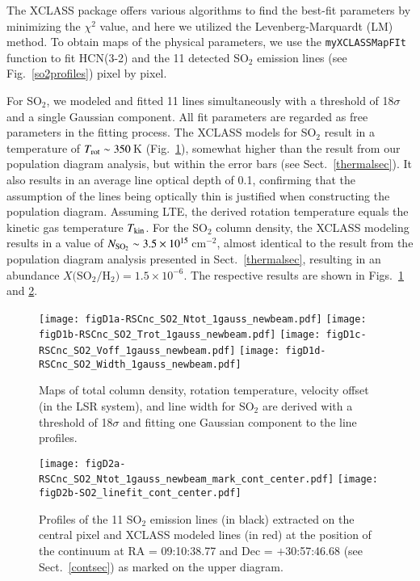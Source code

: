 \documentclass{aa}
\begin{document}
\begin{appendix}
The XCLASS package offers various algorithms to find the best-fit
parameters by minimizing the $\chi^2$ value, and here we utilized the
Levenberg-Marquardt (LM) method. To obtain maps of the physical
parameters, we use the \texttt{myXCLASSMapFIt} function to fit
HCN(3-2) and the 11 detected SO$_2$ emission lines (see
Fig.~\ref{so2profiles}) pixel by pixel.

For SO$_2$, we modeled and fitted 11 lines simultaneously with a
threshold of 18$\sigma$ and a single Gaussian component. All fit
parameters are regarded as free parameters in the fitting process.
The XCLASS models for SO$_2$ result in a temperature of $T_{\rm rot}
\sim350$\,K (Fig.~\ref{fig:so2_xclass}), somewhat higher than the
result from our population diagram analysis, but within the error bars
(see Sect.~\ref{thermalsec}).  It also results in an average line
optical depth of 0.1, confirming that the assumption of the lines
being optically thin is justified when constructing the population
diagram.  Assuming LTE, the derived rotation temperature equals the
kinetic gas temperature $T_{\rm kin}$. For the SO$_2$ column density,
the XCLASS modeling results in a value of $N_{\rm SO_2}
\sim3.5\times10^{15}$\,cm$^{-2}$, almost identical to  the result from
the population diagram analysis presented in Sect.~\ref{thermalsec},
resulting in an abundance $X($SO$_2/$H$_2) = 1.5\times10^{-6}$.  The
respective results are shown in Figs.~\ref{fig:so2_xclass} and
\ref{fig:so2lineft_xclass}.

\begin{figure}[h!]
\texttt{[image: figD1a-RSCnc\_SO2\_Ntot\_1gauss\_newbeam.pdf]}
\texttt{[image: figD1b-RSCnc\_SO2\_Trot\_1gauss\_newbeam.pdf]}
\texttt{[image: figD1c-RSCnc\_SO2\_Voff\_1gauss\_newbeam.pdf]}
\texttt{[image: figD1d-RSCnc\_SO2\_Width\_1gauss\_newbeam.pdf]}
\caption{Maps of total column density, rotation temperature, velocity
  offset (in the LSR system), and line width for SO$_2$ are
  derived with a threshold of 18$\sigma$ and fitting one Gaussian
  component to the line profiles.}
\label{fig:so2_xclass} 
\end{figure}

\begin{figure}[h!]
\texttt{[image: figD2a-RSCnc\_SO2\_Ntot\_1gauss\_newbeam\_mark\_cont\_center.pdf]}
\texttt{[image: figD2b-SO2\_linefit\_cont\_center.pdf]}
\caption{Profiles of the 11 SO$_2$ emission lines (in black) extracted
  on the central pixel and XCLASS modeled lines (in red) at the position
  of the continuum at RA = 09:10:38.77 and Dec = $+$30:57:46.68 (see
  Sect.~\ref{contsec}) as marked on the upper diagram.}
\label{fig:so2lineft_xclass} 
\end{figure}


\end{appendix}
\end{document}
